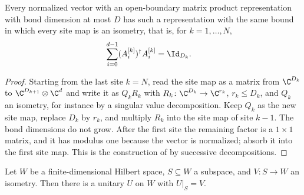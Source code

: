 \begin{lemma}
    \label{lem:obc_left_isometric_representation}
    Every normalized vector with an open-boundary matrix product representation
    with bond dimension at most $D$ has such a representation with the same
    bound in which every site map is an isometry, that is, for $k=1,\dots,N$,
    \begin{align}
        \sum_{i=0}^{d-1}(A^{[k]}_i)^\dagger A^{[k]}_i
         & =\Id_{D_k}.
        \label{eq:obc_left_isometric}
    \end{align}
\end{lemma}
\begin{proof}
    Starting from the last site $k=N$, read the site map as a matrix from
    $\C^{D_k}$ to $\C^{D_{k+1}}\otimes\C^d$ and write it as $Q_kR_k$ with
    $R_k\colon\C^{D_k}\to\C^{r_k}$, $r_k\le D_k$, and $Q_k$ an isometry, for
    instance by a singular value decomposition. Keep $Q_k$ as the new site map,
    replace $D_k$ by $r_k$, and multiply $R_k$ into the site map of site $k-1$.
    The bond dimensions do not grow. After the first
    site the remaining factor is a $1\times 1$ matrix, and it has modulus one
    because the vector is normalized; absorb it into the first site map. This is the construction of \cite{Schoen2005Sequential} by
    successive decompositions.
\end{proof}

\begin{lemma}
    \label{lem:isometry_unitary_completion}
    Let $W$ be a finite-dimensional Hilbert space, $S\subseteq W$ a subspace,
    and $V\colon S\to W$ an isometry. Then there is a unitary $U$ on $W$ with
    $U|_S=V$.
\end{lemma}

